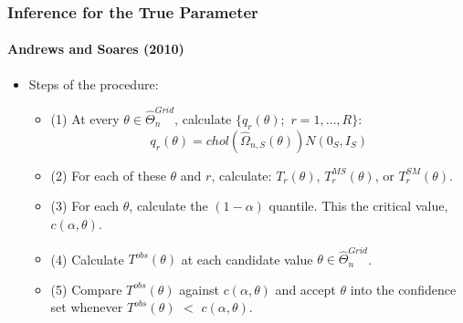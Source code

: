 \begin{frame}
\frametitle{Inference for the True Parameter}
\framesubtitle{Andrews and Soares (2010)}

\begin{itemize}
\item Steps of the procedure: 

\begin{itemize}
\item (1) At every $\theta \in \widehat{\Theta }_{n}^{Grid}$, calculate $%
\{q_{r}(\theta );$ $r=1,\dots ,R\}$: 
\begin{equation*}
q_{r}(\theta )=chol(\widehat{\Omega }_{n,S}(\theta ))N(0_{S},I_{S})
\end{equation*}

\item (2) For each of these $\theta $ and $r$, calculate: $T_{r}(\theta )$, $%
T_{r}^{MS}(\theta )$, or $T_{r}^{SM}(\theta )$. 

\item (3) For each $\theta $, calculate the $(1-\alpha )$ quantile. This the
critical value, $c(\alpha ,\theta )$. 

\item (4) Calculate $T^{obs}(\theta )$ at each candidate value $\theta \in 
\widehat{\Theta }_{n}^{Grid}$. 

\item (5) Compare $T^{obs}(\theta )$ against $c(\alpha ,\theta )$ and accept 
$\theta $ into the confidence set whenever $T^{obs}(\theta )$ $<$ $c(\alpha
,\theta )$. 
\end{itemize}
\end{itemize}
\end{frame}



